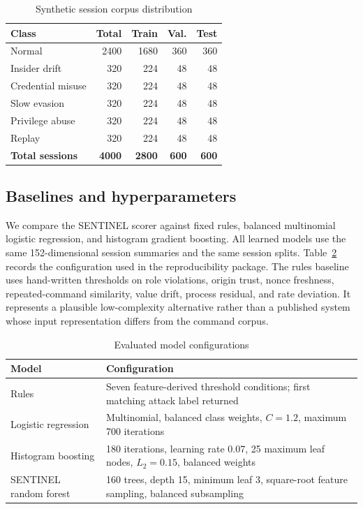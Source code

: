 \documentclass[journal]{IEEEtran}
\renewcommand{\arraystretch}{1.08}
\begin{document}
\begin{table}[t]
\centering
\caption{Synthetic session corpus distribution}
\label{tab:dataset}
\renewcommand{\arraystretch}{1.12}
\begin{tabular}{@{}lrrrr@{}}
\toprule
\textbf{Class} & \textbf{Total} & \textbf{Train} & \textbf{Val.} & \textbf{Test} \\
\midrule
Normal & 2400 & 1680 & 360 & 360 \\
Insider drift & 320 & 224 & 48 & 48 \\
Credential misuse & 320 & 224 & 48 & 48 \\
Slow evasion & 320 & 224 & 48 & 48 \\
Privilege abuse & 320 & 224 & 48 & 48 \\
Replay & 320 & 224 & 48 & 48 \\
\midrule
\textbf{Total sessions} & \textbf{4000} & \textbf{2800} & \textbf{600} & \textbf{600} \\
\bottomrule
\end{tabular}
\end{table}

\subsection{Baselines and hyperparameters}
We compare the SENTINEL scorer against fixed rules, balanced multinomial logistic regression, and histogram gradient boosting. All learned models use the same 152-dimensional session summaries and the same session splits. Table~\ref{tab:hyperparameters} records the configuration used in the reproducibility package. The rules baseline uses hand-written thresholds on role violations, origin trust, nonce freshness, repeated-command similarity, value drift, process residual, and rate deviation. It represents a plausible low-complexity alternative rather than a published system whose input representation differs from the command corpus.

\begin{table}[t]
\centering
\caption{Evaluated model configurations}
\label{tab:hyperparameters}
\renewcommand{\arraystretch}{1.12}
\begin{tabularx}{\columnwidth}{@{}lX@{}}
\toprule
\textbf{Model} & \textbf{Configuration} \\
\midrule
Rules & Seven feature-derived threshold conditions; first matching attack label returned \\
Logistic regression & Multinomial, balanced class weights, $C=1.2$, maximum 700 iterations \\
Histogram boosting & 180 iterations, learning rate 0.07, 25 maximum leaf nodes, $L_2=0.15$, balanced weights \\
SENTINEL random forest & 160 trees, depth 15, minimum leaf 3, square-root feature sampling, balanced subsampling \\
\bottomrule
\end{tabularx}
\end{table}
\end{document}
